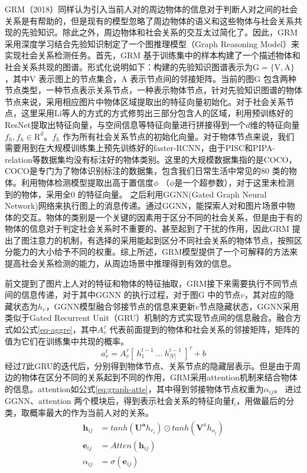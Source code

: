 GRM（2018）\cite{wang2018deep}同样认为引入当前人对的周边物体的信息对于判断人对之间的社会关系是有帮助的，但是现有的模型忽略了周边物体的语义和这些物体与社会关系共现的先验知识。除此之外，周边物体和社会关系的交互太过简化了。因此，GRM 采用深度学习结合先验知识制定了一个图推理模型（Graph Reasoning Model）来实现社会关系检测任务。首先，GRM 基于训练集中的样本构建了一个描述物体和社会关系共现的图谱。形式化说明如下：构建的先验知识图谱表示为$\mathrm{G} = \{\mathrm{V},\mathrm{A}\}$，其中$\mathrm{V}$ 表示图上的节点集合，$\mathrm{A}$ 表示节点间的邻接矩阵。当前的图$\mathrm{G}$ 包含两种节点类型，一种节点表示关系节点，一种表示物体节点，针对先验知识图谱的物体节点来说，采用相应图片中物体区域提取出的特征向量初始化。对于社会关系节点，这里采用Li等人的方式\cite{li2017dual-glance}的方式修剪出三部分包含人的区域，利用预训练好的ResNet提取出特征向量，与空间信息等特征向量进行拼接得到一个$d$维的特征向量$f_{h},f_{h} \in \mathrm{R}^d$。$f_h$ 作为所有社会关系节点的初始化向量。对于物体节点来说，我们需要用到在大规模训练集上预先训练好的faster-RCNN\cite{ren2015faster}，由于PISC和PIPA-relation等数据集均没有标注好的物体类别。这里的大规模数据集指的是COCO\cite{lin2014microsoft}，COCO是专门为了物体识别标注的数据集，包含我们日常生活中常见的80 类的物体。利用物体检测模型提取出高于置信度$\phi$ （$\phi$是一个超参数），对于这里未检测到的物体，采用全$0$ 的特征向量。
之后利用GGNN(Gated Graph Neural Network)网络\cite{li2016gated}来执行图上的消息传递。通过GGNN，能探索人对和图片场景中物体的交互。物体的类别是一个关键的因素用于区分不同的社会关系，但是由于有的物体的信息对于判定社会关系时不重要的、甚至起到了干扰的作用，因此GRM 提出了图注意力的机制，有选择的采用能起到区分不同社会关系的物体节点，按照区分能力的大小给予不同的权重。综上所述，GRM模型提供了一个可解释的方法来提高社会关系检测的能力，从周边场景中推理得到有效的信息。

前文提到了图片上人对的特征和物体的特征抽取，GRM接下来需要执行不同节点间的信息传递，对于其中GGNN 的执行过程，对于图$\mathrm{G}$ 中的节点$v$，其对应的隐藏状态为$h_{v}$，GGNN模型融合邻接节点的信息来更新$v$节点隐藏状态，GGNN采用类似于Gated Recurrent Unit（GRU）\cite{cho2014learning}机制的方式实现节点间的信息融合。融合方式如公式\ref{eq-aggre}，其中$A_v^{\tau}$ 代表前面提到的物体和社会关系的邻接矩阵，矩阵的值为它们在训练集中共现的概率。
\begin{equation}\label{eq-aggre}
    a_v^t = A_{v}^{\tau}[~h_1^{t-1}~...~h_{|V|}^{t-1}~]^{\tau} + b
\end{equation}
经过$T$此GRU的迭代后，分别得到物体节点、关系节点的隐藏层表示。但是由于周边的物体在区分不同的关系起到不同的作用，GRM采用attention机制来结合物体的信息。attention如公式\ref{eq:graph-atte}，其中得到邻接物体节点权重为$\alpha_{ij}$。 进过GGNN、attention 两个模块后，得到表示社会关系的特征向量$\mathbf{f}_{i}$，用做最后的分类，取概率最大的作为当前人对的关系。
\begin{equation}\label{eq:graph-atte}
    \begin{split}
        \mathbf{h}_{ij} &= tanh(\mathbf{U^a}h_{r_{i}}) \odot tanh(\mathbf{V}^ah_{o_{j}}) \\
        \mathbf{e}_{ij} &= Atten(\mathbf{h}_{ij}) \\
        \alpha_{ij} &= \sigma(\mathbf{e}_{ij})
    \end{split}
\end{equation}

